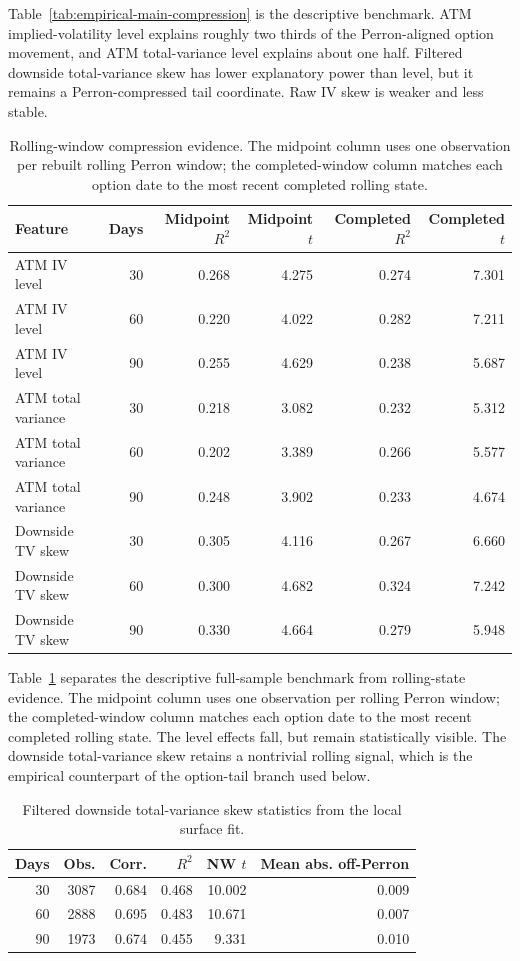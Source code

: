 \documentclass[11pt,a4paper]{amsart}
\theoremstyle{plain}
\theoremstyle{definition}
\theoremstyle{remark}
\begin{document}
Table~\ref{tab:empirical-main-compression} is the descriptive benchmark.  ATM implied-volatility
level explains roughly two thirds of the Perron-aligned option movement, and ATM total-variance
level explains about one half.  Filtered downside total-variance skew has lower explanatory power
than level, but it remains a Perron-compressed tail coordinate.  Raw IV skew is weaker and less
stable.

\begin{table}[t]
\centering
\small
\begin{tabular}{lrrrrr}
\hline
Feature & Days & Midpoint $R^2$ & Midpoint $t$ & Completed $R^2$ & Completed $t$ \\
\hline
ATM IV level & 30 & 0.268 & 4.275 & 0.274 & 7.301 \\
ATM IV level & 60 & 0.220 & 4.022 & 0.282 & 7.211 \\
ATM IV level & 90 & 0.255 & 4.629 & 0.238 & 5.687 \\
ATM total variance & 30 & 0.218 & 3.082 & 0.232 & 5.312 \\
ATM total variance & 60 & 0.202 & 3.389 & 0.266 & 5.577 \\
ATM total variance & 90 & 0.248 & 3.902 & 0.233 & 4.674 \\
Downside TV skew & 30 & 0.305 & 4.116 & 0.267 & 6.660 \\
Downside TV skew & 60 & 0.300 & 4.682 & 0.324 & 7.242 \\
Downside TV skew & 90 & 0.330 & 4.664 & 0.279 & 5.948 \\
\hline
\end{tabular}
\caption{Rolling-window compression evidence.  The midpoint column uses one observation per rebuilt rolling
Perron window; the completed-window column matches each option date to the most recent completed
rolling state.}
\label{tab:empirical-rolling-robustness}
\end{table}

Table~\ref{tab:empirical-rolling-robustness} separates the descriptive full-sample benchmark from
rolling-state evidence.  The midpoint column uses one observation per rolling Perron window; the
completed-window column matches each option date to the most recent completed rolling state.  The
level effects fall, but remain statistically visible.  The downside total-variance skew retains a
nontrivial rolling signal, which is the empirical counterpart of the option-tail branch used below.

\begin{table}[t]
\centering
\small
\begin{tabular}{rrrrrr}
\hline
Days & Obs. & Corr. & $R^2$ & NW $t$ & Mean abs. off-Perron \\
\hline
30 & 3087 & 0.684 & 0.468 & 10.002 & 0.009 \\
60 & 2888 & 0.695 & 0.483 & 10.671 & 0.007 \\
90 & 1973 & 0.674 & 0.455 & 9.331 & 0.010 \\
\hline
\end{tabular}
\caption{Filtered downside total-variance skew statistics from the local surface fit.}
\label{tab:empirical-certified-skew}
\end{table}
\end{document}
